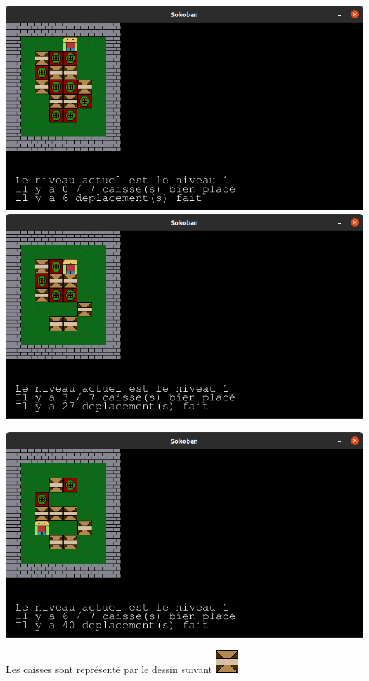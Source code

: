 \documentclass[a4paper,12pt]{article} %
\begin{document}
\includegraphics[scale = 0.25]{../picture/game1.png}
\includegraphics[scale = 0.25]{../picture/game2.png}

\includegraphics[scale = 0.25]{../picture/game3.png}

Les caisses sont représenté par le dessin suivant \includegraphics{../picture/caisse.png}
\end{document}

